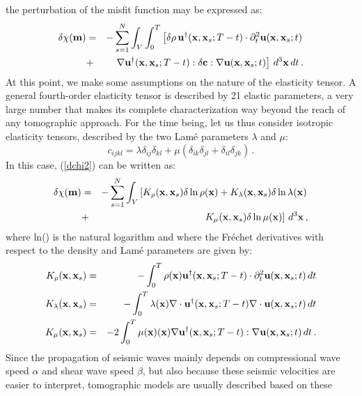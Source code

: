 the perturbation of the misfit function may be expressed as:
\begin{eqnarray}
\delta\chi(\mathbf{m}) & = & - \sum_{s=1}^N\nonumber \int_V \int_0^T \left[\delta\rho \, \mathbf{u}^\dagger(\mathbf{x},\mathbf{x}_s;T-t)\cdot
\partial^2_{t}\mathbf{u}(\mathbf{x},\mathbf{x}_s;t) \right. \nonumber \\
& +  & \left. \nabla\mathbf{u}^\dagger(\mathbf{x},\mathbf{x}_s;T-t):\delta \mathbf{c}: \nabla \mathbf{u}(\mathbf{x},\mathbf{x}_s;t) \right] \, d^3\mathbf{x} \, dt \, .
\label{dchi2}
\end{eqnarray}
At this point, we make some assumptions on the nature of the elasticity tensor.
A general fourth-order elasticity tensor is described by 21 elastic parameters, a very large number that makes its complete characterization
way beyond the reach of any tomographic approach. For the time being, let us thus consider isotropic elasticity tensors,
described by the two Lam\'e parameters $\lambda$ and $\mu$:
\begin{equation}
c_{ijkl} = \lambda \delta_{ij}\delta_{kl}+\mu(\delta_{ik}\delta_{jl}+\delta_{il}\delta_{jk}) \, .
\end{equation}
In this case, (\ref{dchi2}) can be written as:
\begin{eqnarray}
\delta\chi(\mathbf{m}) & = & - \sum_{s=1}^N\nonumber \int_V \left[ K_\rho(\mathbf{x},\mathbf{x}_s)\delta\ln\rho(\mathbf{x})
+K_\lambda(\mathbf{x},\mathbf{x}_s)\delta\ln\lambda(\mathbf{x}) \right. \nonumber \\
& + & \left. K_\mu(\mathbf{x},\mathbf{x}_s)\delta\ln\mu(\mathbf{x})\right] \, d^3\mathbf{x} \, ,
\label{dchi2_1}
\end{eqnarray}
where ln() is the natural logarithm and where the Fr\'echet derivatives with respect to the density and Lam\'e parameters are given by:
\begin{eqnarray}
K_\rho(\mathbf{x},\mathbf{x}_s) & = & - \int_0^T \rho(\mathbf{x}) \mathbf{u}^\dagger(\mathbf{x},\mathbf{x}_s;T-t)\cdot \partial^2_{t}\mathbf{u}(\mathbf{x},\mathbf{x}_s;t) \, dt \\
K_\lambda(\mathbf{x},\mathbf{x}_s) & = & - \int_0^T \lambda(\mathbf{x}) \nabla\cdot\mathbf{u}^\dagger(\mathbf{x},\mathbf{x}_s;T-t) \nabla\cdot\mathbf{u}(\mathbf{x},\mathbf{x}_s;t) \, dt \\
K_\mu(\mathbf{x},\mathbf{x}_s) & = & -2 \int_0^T \mu(\mathbf{x}) (\mathbf{x}) \nabla\mathbf{u}^\dagger(\mathbf{x},\mathbf{x}_s;T-t) :\nabla\mathbf{u}(\mathbf{x},\mathbf{x}_s;t)\, dt \, .
\end{eqnarray}
Since the propagation of seismic waves mainly depends on compressional wave speed $\alpha$ and shear wave speed $\beta$,
but also because these seismic velocities are easier to interpret, tomographic models are usually described based on these
